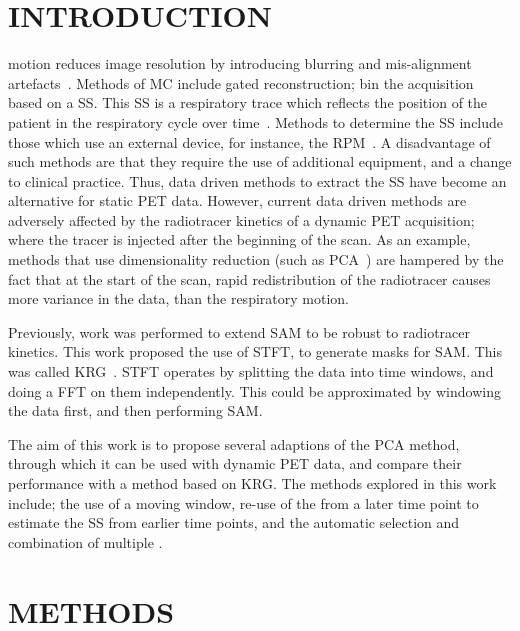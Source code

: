 \section{INTRODUCTION} \label{sec:introduction}
     motion reduces image resolution by introducing blurring and mis-alignment artefacts~\cite{Nehmeh2008a}. Methods of \gls{MC} include gated reconstruction; bin the acquisition based on a \gls{SS}. This \gls{SS} is a respiratory trace which reflects the position of the patient in the respiratory cycle over time~\cite{Kesner2010AMethods, Kesner2013GatingPET}. Methods to determine the \gls{SS} include those which use an external device, for instance, the \gls{RPM}~\cite{Bettinardi2013Motion-trackingPET/CT}. A disadvantage of such methods are that they require the use of additional equipment, and a change to clinical practice. Thus, data driven methods to extract the \gls{SS} have become an alternative for static \acrshort{PET} data. However, current data driven methods are adversely affected by the radiotracer kinetics of a dynamic \acrshort{PET} acquisition; where the tracer is injected after the beginning of the scan. As an example, methods that use dimensionality reduction (such as \acrshort{PCA}~\cite{Thielemans2011, Bertolli2018Data-DrivenTomography}) are hampered by the fact that at the start of the scan, rapid redistribution of the radiotracer causes more variance in the data, than the respiratory motion.
    
    Previously, work was performed to extend \gls{SAM} to be robust to radiotracer kinetics. This work proposed the use of \gls{STFT}, to generate masks for \gls{SAM}. This was called \gls{KRG}~\cite{Schleyer2014}. \gls{STFT} operates by splitting the data into time windows, and doing a \acrlong{FFT} on them independently. This could be approximated by windowing the data first, and then performing \gls{SAM}.
    
    The aim of this work is to propose several adaptions of the \acrshort{PCA} method, through which it can be used with dynamic \acrshort{PET} data, and compare their performance with a method based on \gls{KRG}. The methods explored in this work include; the use of a moving window, re-use of the  from a later time point to estimate the \gls{SS} from earlier time points, and the automatic selection and combination of multiple .

    
\section{METHODS} \label{sec:methods}
